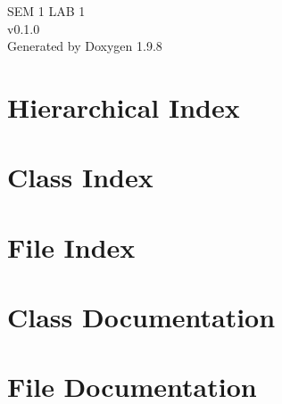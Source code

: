 \documentclass[twoside]{book}
\newcommand{\+}{\discretionary{\mbox{\scriptsize$\hookleftarrow$}}{}{}}
\newcommand{\clearemptydoublepage}{%
    \newpage{\pagestyle{empty}\cleardoublepage}%
  }
\begin{document}
  \raggedbottom
    \hypersetup{pageanchor=false,
                bookmarksnumbered=true,
                pdfencoding=unicode
               }
  \begin{titlepage}
  \vspace*{7cm}
  \begin{center}%
  {\Large SEM 1 LAB 1}\\
  [1ex]\large v0.\+1.\+0 \\
  \vspace*{1cm}
  {\large Generated by Doxygen 1.9.8}\\
  \end{center}
  \end{titlepage}
  \clearemptydoublepage
  \tableofcontents
  \clearemptydoublepage
  \hypersetup{pageanchor=true}


\chapter{Hierarchical Index}

\chapter{Class Index}

\chapter{File Index}

\chapter{Class Documentation}
















\chapter{File Documentation}
















  \backmatter
  \newpage
  \clearemptydoublepage
  \printindex
\end{document}

